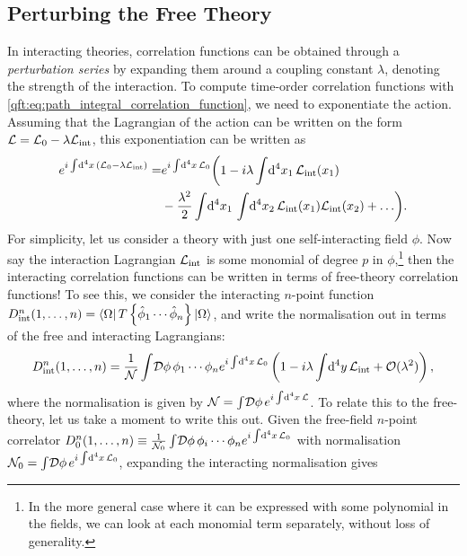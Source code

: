\documentclass[../main.tex]{subfiles}
\begin{document}
\subsection{Perturbing the Free Theory}
In interacting theories, correlation functions can be obtained through a \emph{perturbation series} by expanding them around a coupling constant \(\lambda\), denoting the strength of the interaction.
To compute time-order correlation functions with \cref{qft:eq:path_integral_correlation_function}, we need to exponentiate the action.
Assuming that the Lagrangian of the action can be written on the form \(\mathcal{L} = \mathcal{L}_0 - \lambda\mathcal{L}_\text{int}\), this exponentiation can be written as
\begin{align}
  \label{qft:eq:Lint_exp_expansion}
  e^{i \int \!\mathrm{d}^4x\, \left(\mathcal{L}_0 - \lambda\mathcal{L}_\text{int}\right)} = & e^{i \int \!\mathrm{d}^4x\, \mathcal{L}_0} \biggl(1 - i\lambda\int \!\mathrm{d}^4x_1\, \mathcal{L}_\text{int}(x_1)                            \\
                                                                 & - \frac{\lambda^2}{2} \int \!\mathrm{d}^4x_1\,\int \!\mathrm{d}^4x_2\, \mathcal{L}_\text{int}(x_1) \mathcal{L}_\text{int}(x_2) + \ldots\biggr).
\end{align}
For simplicity, let us consider a theory with just one self-interacting field \(\phi\).
Now say the interaction Lagrangian \(\mathcal{L}_\text{int}\) is some monomial of degree \(p\) in \(\phi\),\footnote{In the more general case where it can be expressed with some polynomial in the fields, we can look at each monomial term separately, without loss of generality.} then the interacting correlation functions can be written in terms of free-theory correlation functions!
To see this, we consider the interacting \(n\)-point function \(D^n_\text{int}(1,\ldots, n) = \left\langle \Omega \right| T\left\{\hat\phi_1 \cdots \hat\phi_n\right\} \left| \Omega \right\rangle\), and write the normalisation out in terms of the free and interacting Lagrangians:
\begin{align}
  \label{qft:eq:n-point_interactive_correlator}
  D^n_\text{int}(1,\ldots, n) = \frac{1}{\mathcal{N}} \int\!\mathcal{D}\phi\, \phi_1\cdots \phi_n e^{i\int \!\mathrm{d}^4x\,\mathcal{L}_0}\left(1 - i\lambda \int \!\mathrm{d}^4y\,\mathcal{L}_\text{int} + \mathcal{O}(\lambda^2)\right),
\end{align}
where the normalisation is given by \(\mathcal{N} = \int\!\mathcal{D}\phi\, e^{i\int \!\mathrm{d}^4x\,\mathcal{L}}\).
To relate this to the free-theory, let us take a moment to write this out.
Given the free-field \(n\)-point correlator \(D^n_0(1,\ldots,n) \equiv \frac{1}{\mathcal{N}_0} \int\!\mathcal{D}\phi\, \phi_i \cdots \phi_n e^{i\int \!\mathrm{d}^4x\,\mathcal{L}_0}\) with normalisation \(\mathcal{N}_0 = \int\!\mathcal{D}\phi\, e^{i\int \!\mathrm{d}^4x\,\mathcal{L}_0}\), expanding the interacting normalisation gives
\end{document}
